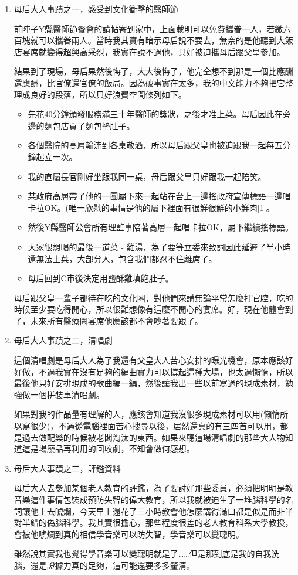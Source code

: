 \documentclass[a5paper, 12pt
]{book}
\begin{document}
\begin{enumerate}
\def\labelenumi{\arabic{enumi}.}
\item
  母后大人事蹟之一，感受到文化衝擊的醫師節

  前陣子Y縣醫師節餐會的請帖寄到家中，上面載明可以免費攜眷一人，若繳六百塊就可以攜眷兩人。當時我其實有暗示母后說不要去，無奈的是他聽到大飯店宴席就變得超興高采烈，我實在說不過他，只好被迫攜母后跟父皇參加。

  結果到了現場，母后果然後悔了，大大後悔了，他完全想不到那是一個比應酬還應酬，比官僚還官僚的飯局。因為破事實在太多，我的中文能力不夠把它整理成良好的段落，所以只好浪費空間條列如下。

  \begin{itemize}
  \item
    先花40分鐘頒發服務滿三十年醫師的獎狀，之後才准上菜。母后因此在旁邊的麵包店買了麵包墊肚子。
  \item
    各個醫院的高層輪流到各桌敬酒，所以母后跟父皇也被迫跟我一起每五分鐘起立一次。
  \item
    我的直屬長官剛好坐跟我同一桌，母后跟父皇只好跟我一起陪笑。
  \item
    某政府高層帶了他的一團屬下來一起站在台上一邊搖政府宣傳標語一邊唱卡拉OK。(唯一欣慰的事情是他的屬下裡面有很鮮很鮮的小鮮肉{[}1{]}。
  \item
    然後Y縣醫師公會所有理監事陪著高層一起唱卡拉OK，屬下繼續搖標語。
  \item
    大家很想喝的最後一道菜 -
    雞湯，為了要等立委來致詞因此延遲了半小時還無法上菜，大部分人，包含我們都忍不住離席了。
  \item
    母后回到C市後決定用鹽酥雞填飽肚子。
  \end{itemize}

  母后跟父皇一輩子都待在吃的文化圈，對他們來講無論平常怎麼打官腔，吃的時候至少要吃得開心，所以很難想像有這麼不開心的宴席。好，現在他體會到了，未來所有醫療圈宴席他應該都不會吵著要跟了。
\item
  母后大人事蹟之二，清唱劇

  這個清唱劇是母后大人為了我還有父皇大人苦心安排的曝光機會，原本應該好好做，不過我實在沒有足夠的編曲實力可以撐起這種大場，也太過懶惰，所以最後他只好安排現成的歌曲編一編，然後讓我出一些以前寫過的現成素材，勉強做一個拼裝車清唱劇。

  如果對我的作品量有理解的人，應該會知道我沒很多現成素材可以用(懶惰所以寫很少)，不過從電腦裡面苦心搜尋以後，居然還真的有三四首可以用，都是過去做配樂的時候被老闆淘汰的東西。如果來聽這場清唱劇的那些大人物知道這是場廢品再利用的回收劇，不知會做何感想。
\item
  母后大人事蹟之三，評鑑資料

  母后大人去參加某個老人教育的評鑑，為了要討好那些委員，必須把明明是教音樂這件事情包裝成預防失智的偉大教育，所以我就被迫生了一堆腦科學的名詞讓他上去唬爛，今天早上還花了三小時教會他怎麼講得滿口都是似是而非半對半錯的偽腦科學。我其實很擔心，那些程度很差的老人教育科系大學教授，會被他唬爛到真的相信學音樂可以防失智，學音樂可以變聰明。

  雖然說其實我也覺得學音樂可以變聰明就是了\ldots\ldots 但是那到底是我的自我洗腦，還是證據力真的足夠，這可能還要多多釐清。
\end{enumerate}
\end{document}

